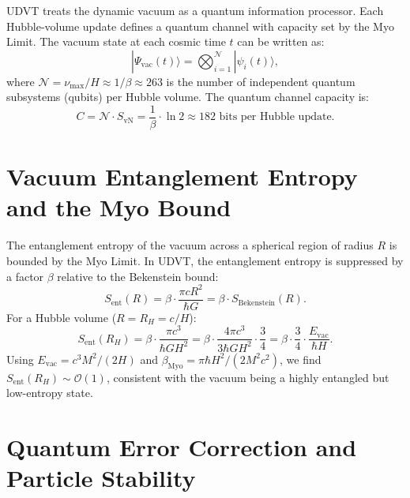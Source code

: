 \documentclass[12pt,a4paper]{book}
\theoremstyle{definition}
\theoremstyle{remark}
\begin{document}
UDVT treats the dynamic vacuum as a quantum information processor. Each Hubble-volume update defines a quantum channel with capacity set by the Myo Limit. The vacuum state at each cosmic time $t$ can be written as:
\begin{equation}
    |\Psi_{\mathrm{vac}}(t)\rangle = \bigotimes_{i=1}^{\mathcal{N}} |\psi_i(t)\rangle,
\end{equation}
where $\mathcal{N} = \nu_{\mathrm{max}}/H \approx 1/\beta \approx 263$ is the number of independent quantum subsystems (qubits) per Hubble volume. The quantum channel capacity is:
\begin{equation}
    C = \mathcal{N} \cdot S_{\mathrm{vN}} = \frac{1}{\beta} \cdot \ln 2 \approx 182 \text{ bits per Hubble update}.
\end{equation}

\section{Vacuum Entanglement Entropy and the Myo Bound}

The entanglement entropy of the vacuum across a spherical region of radius $R$ is bounded by the Myo Limit. In UDVT, the entanglement entropy is suppressed by a factor $\beta$ relative to the Bekenstein bound:
\begin{equation}
    S_{\mathrm{ent}}(R) = \beta \cdot \frac{\pi c R^2}{\hbar G} = \beta \cdot S_{\mathrm{Bekenstein}}(R).
\end{equation}
For a Hubble volume ($R = R_H = c/H$):
\begin{equation}
    S_{\mathrm{ent}}(R_H) = \beta \cdot \frac{\pi c^3}{\hbar G H^2} = \beta \cdot \frac{4\pi c^3}{3\hbar G H^2} \cdot \frac{3}{4} = \beta \cdot \frac{3}{4} \cdot \frac{E_{\mathrm{vac}}}{\hbar H}.
\end{equation}
Using $E_{\mathrm{vac}} = c^3 M^2/(2H)$ and $\beta_{\mathrm{Myo}} = \pi\hbar H^2/(2M^2 c^2)$, we find $S_{\mathrm{ent}}(R_H) \sim \mathcal{O}(1)$, consistent with the vacuum being a highly entangled but low-entropy state.

\section{Quantum Error Correction and Particle Stability}
\end{document}
